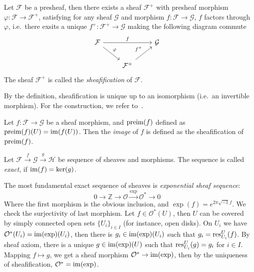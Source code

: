 \begin{defn}
    Let $\mathcal{F}$ be a presheaf, then there exists a sheaf $\mathcal{F}^+$ with presheaf morphism $\varphi:\mathcal{F}\to\mathcal{F}^+$, satisfying for any sheaf $\mathcal{G}$ and morphism $f:\mathcal{F}\to\mathcal{G}$, $f$ factors through $\varphi$, i.e.\ there exsits a unique $f^+:\mathcal{F}^+\to\mathcal{G}$ making the following diagram commute
    \[\begin{tikzcd}
        \mathcal{F} \ar[rr, "f"] \ar[dr, "\varphi"] & & \mathcal{G} \\
        {} & \mathcal{F}^+\ar[ur, "f^+"] & {}
    \end{tikzcd}\]
    The sheaf $\mathcal{F}^+$ is called the \emph{sheafification} of $\mathcal{F}$.
\end{defn}

By the definition, sheafification is unique up to an isomorphism (i.e.\ an invertible morphism).
For the construction, we refer to~\cite[Section 6.17]{stacks-project}.

\begin{defn}
    Let $f:\mathcal{F}\to\mathcal{G}$ be a sheaf morphism, and $\operatorname{preim}(f)$ defined as $\operatorname{preim}(f)(U)=\operatorname{im}(f(U))$.
    Then the \emph{image} of $f$ is defined as the sheafification of $\operatorname{preim}(f)$.
\end{defn}

\begin{defn}
    Let $\mathcal{F}\xrightarrow{f}\mathcal{G}\xrightarrow{g}\mathcal{H}$ be sequence of sheaves and morphisms.
    The sequence is called \emph{exact}, if $\operatorname{im}(f)=\ker(g)$.
\end{defn}

\begin{eg}
    The most fundamental exact sequence of sheaves is \emph{exponential sheaf sequence}:
    \[0\to\mathbb{Z}\to\mathcal{O}\xrightarrow{\exp}\mathcal{O}^*\to 0\]
    Where the first morphism is the obvious inclusion, and $\exp(f)=e^{2\pi\sqrt{-1}f}$.
    We check the surjectivity of last morphism.
    Let $f\in\mathcal{O}^*(U)$, then $U$ can be covered by simply connected open sets $\{U_i\}_{i\in I}$ (for instance, open disks).
    On $U_i$ we have $\mathcal{O}^*(U_i)=\operatorname{im}(\exp)(U_i)$, then there is $g_i\in\operatorname{im}(\exp)(U_i)$ such that $g_i=\operatorname{res}^U_{U_i}(f)$.
    By sheaf axiom, there is a unique $g\in\operatorname{im}(\exp)(U)$ such that $\operatorname{res}^U_{U_i}(g)=g_i$ for $i\in I$.
    Mapping $f\mapsto g$, we get a sheaf morphism $\mathcal{O}^*\to\operatorname{im}(\exp)$, then by the uniqueness of sheafification, $\mathcal{O}^*=\operatorname{im}(\exp)$.
\end{eg}
